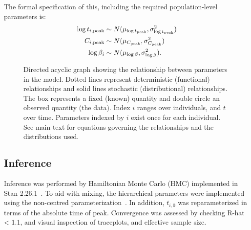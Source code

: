 \documentclass[thesis.tex]{subfiles}
\begin{document}
The formal specification of this, including the required population-level parameters is:
\begin{align}
    \log t_{i,\text{peak}} &\sim N(\mu_{\log t_\text{peak}}, \sigma_{\log t_\text{peak}}^2) 
    \label{eq:paper:tpeak}\\
    C_{i,\text{peak}} &\sim N(\mu_{C_\text{peak}}, \sigma_{C_\text{peak}}^2) 
    \label{eq:paper:Cpeak}\\
    \log \beta_i &\sim N(\mu_{\log \beta}, \sigma_{\log \beta}^2).
    \label{eq:paper:beta}
\end{align}

\begin{figure}
    \centering
    \caption[DAG showing hiearchical structure]{Directed acyclic graph showing the relationship between parameters in the model. Dotted lines represent deterministic (functional) relationships and solid lines stochastic (distributional) relationships. The box represents a fixed (known) quantity and double circle an observed quantity (the data). Index $i$ ranges over individuals, and $t$ over time. Parameters indexed by $i$ exist once for each individual. See main text for equations governing the relationships and the distributions used.}
    \label{fig:paper:model_DAG}
\end{figure}

\subsection{Inference}

Inference was performed by Hamiltonian Monte Carlo (HMC) implemented in Stan 2.26.1~\autocite{Stan-2-32-2}.
To aid with mixing, the hierarchical parameters were implemented using the non-centred parameterization~\autocites{papaspiliopoulosGeneral,stanReparameterization}.
In addition, $t_{i,0}$ was reparameterized in terms of the absolute time of peak.
Convergence was assessed by checking R-hat < 1.1, and visual inspection of traceplots, and effective sample size.
\end{document}
